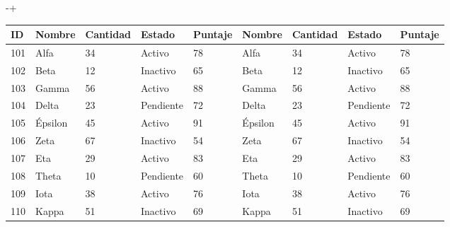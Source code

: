 \begin{adjustwidth}{0pt}{-\dimexpr\marginparsep+\marginparwidth\relax}%
\centering
{\sf\footnotesize\setlength\tabcolsep{4pt}%
  \begin{tabular}{@{}lllllllll@{}}
    \toprule
    \textbf{ID} & \textbf{Nombre} & \textbf{Cantidad} & \textbf{Estado} & \textbf{Puntaje} & \textbf{Nombre} & \textbf{Cantidad} & \textbf{Estado} & \textbf{Puntaje} \\
    \midrule
    101 & Alfa & 34 & Activo & 78 & Alfa & 34 & Activo & 78 \\
    \midrule
    102 & Beta & 12 & Inactivo & 65 & Beta & 12 & Inactivo & 65 \\
    \midrule
    103 & Gamma & 56 & Activo & 88 & Gamma & 56 & Activo & 88 \\
    \midrule
    104 & Delta & 23 & Pendiente & 72 & Delta & 23 & Pendiente & 72 \\
    \midrule
    105 & Épsilon & 45 & Activo & 91 & Épsilon & 45 & Activo & 91 \\
    \midrule
    106 & Zeta & 67 & Inactivo & 54 & Zeta & 67 & Inactivo & 54 \\
    \midrule
    107 & Eta & 29 & Activo & 83 & Eta & 29 & Activo & 83 \\
    \midrule
    108 & Theta & 10 & Pendiente & 60 & Theta & 10 & Pendiente & 60 \\
    \midrule
    109 & Iota & 38 & Activo & 76 & Iota & 38 & Activo & 76 \\
    \midrule
    110 & Kappa & 51 & Inactivo & 69 & Kappa & 51 & Inactivo & 69 \\
    \bottomrule
  \end{tabular}
}%
\label{tbl-ancho}
\vspace{\intextsep}
\end{adjustwidth}

